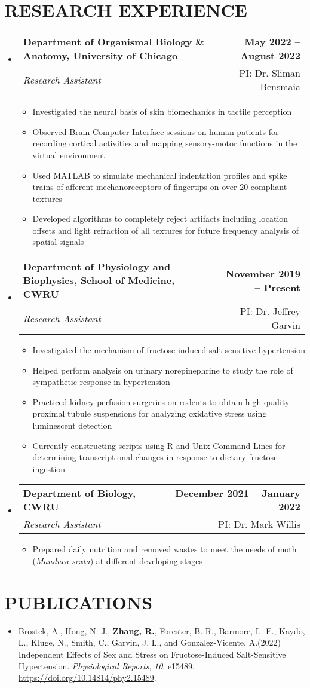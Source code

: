 \documentclass[letterpaper,11pt]{article}
\makeatletter
\newcommand{\resumeItem}[1]{
	\item\small{
		{#1 \vspace{0pt}}
	}
}
\newcommand{\resumeSubheading}[4]{
	\vspace{-2pt}\item
	\begin{tabular*}{1.0\textwidth}[t]{l@{\extracolsep{\fill}}r}
		\textbf{#1} & \textbf{\small #2} \\
		\textit{\small#3} & {\small #4} \\
	\end{tabular*}\vspace{-4pt}
}
\newcommand{\resumeSubHeadingListStart}{\begin{itemize}[leftmargin=0.0in, label={}]}
\newcommand{\resumeSubHeadingListEnd}{\end{itemize}}
\newcommand{\resumeItemListStart}{\begin{itemize}}
\newcommand{\resumeItemListEnd}{\end{itemize}\vspace{-5pt}}
\makeatother
\begin{document}
	\section{RESEARCH EXPERIENCE}
	\resumeSubHeadingListStart
	\resumeSubheading
	{Department of Organismal Biology \& Anatomy, University of Chicago}{May 2022 -- August 2022}
	{Research Assistant}{PI: Dr. Sliman Bensmaia}
	\resumeItemListStart
	\resumeItem{Investigated the neural basis of skin biomechanics in tactile perception}
	\resumeItem{Observed Brain Computer Interface sessions on human patients for recording cortical activities and mapping sensory-motor functions in the virtual environment}
	\resumeItem{Used MATLAB to simulate mechanical indentation profiles and spike trains of afferent mechanoreceptors of fingertips on over 20 compliant textures}
	\resumeItem{Developed algorithms to completely reject artifacts including location offsets and light refraction of all textures for future frequency analysis of spatial signals}
	\resumeItemListEnd
	
	\resumeSubheading
	{Department of Physiology and Biophysics, School of Medicine, CWRU}{November 2019 -- Present}
	{Research Assistant}{PI: Dr. Jeffrey Garvin}
	\resumeItemListStart
	\resumeItem{Investigated the mechanism of fructose-induced salt-sensitive hypertension}
	\resumeItem{Helped perform analysis on urinary norepinephrine to study the role of sympathetic response in hypertension}
	\resumeItem{Practiced kidney perfusion surgeries on rodents to obtain high-quality proximal tubule suspensions for analyzing oxidative stress using luminescent detection}
	\resumeItem{Currently constructing scripts using R and Unix Command Lines for determining transcriptional changes in response to dietary fructose ingestion}
	\resumeItemListEnd
	
	\resumeSubheading
	{Department of Biology,  CWRU}{December 2021 -- January 2022}
	{Research Assistant}{PI: Dr. Mark Willis}
	\resumeItemListStart
	\resumeItem{Prepared daily nutrition and removed wastes to meet the needs of  moth (\textit{Manduca sexta}) at different developing stages}
	\resumeItemListEnd
	\resumeSubHeadingListEnd 

	\section{PUBLICATIONS}
	\begin{itemize}[itemsep=-2pt, parsep=5pt]
		\item[] Brostek, A., Hong, N. J., \textbf{Zhang, R.}, Forester, B. R., Barmore, L. E., Kaydo, L., Kluge, N., Smith, C., Garvin, J. L., and Gonzalez-Vicente, A.(2022) Independent Effects of Sex and Stress on Fructose-Induced Salt-Sensitive Hypertension. \textit{Physiological Reports}, \textit{10}, e15489. \url{https://doi.org/10.14814/phy2.15489}. 
	\end{itemize}
	
\end{document}
